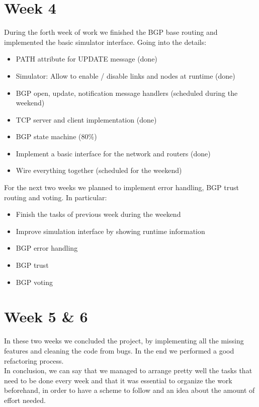 \section{Week 4}
During the forth week of work we finished the BGP base routing and implemented
the basic simulator interface. Going into the details:
\begin{itemize}
    \item PATH attribute for UPDATE message (done)
    \item Simulator: Allow to enable / disable links and nodes at runtime (done)
    \item BGP open, update, notification message handlers (scheduled during the weekend)
    \item TCP server and client implementation (done)
    \item BGP state machine ($80\%$)
    \item Implement a basic interface for the network and routers (done)
    \item Wire everything together (scheduled for the weekend)
\end{itemize}

For the next two weeks we planned to implement error handling, BGP trust routing 
and voting. In particular:
\begin{itemize}
    \item Finish the tasks of previous week during the weekend
    \item Improve simulation interface by showing runtime information
    \item BGP error handling
    \item BGP trust
    \item BGP voting
\end{itemize}

\section{Week 5 \& 6}
In these two weeks we concluded the project, by implementing all the missing features
and cleaning the code from bugs. In the end we performed a good refactoring process.\\
In conclusion, we can say that we managed to arrange pretty well the tasks that need to be 
done every week and that it was essential to organize the work beforehand, in order to
have a scheme to follow and an idea about the amount of effort needed.